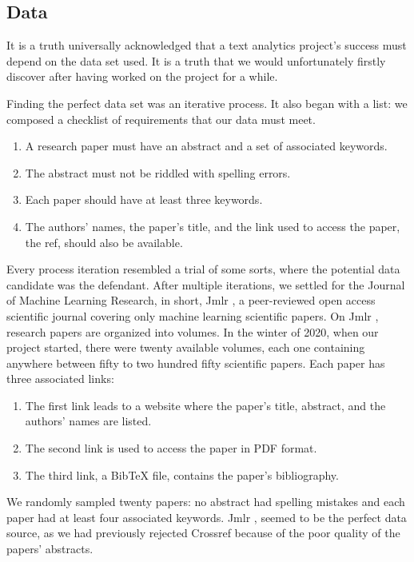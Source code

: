 \subsection{Data}

It is a truth universally acknowledged that a text analytics project's success must depend on the data set used. It is a truth that we would unfortunately firstly discover after having worked on the project for a while. 


Finding the perfect data set was an iterative process. It also began with a list: we composed a checklist of requirements that our data must meet. 
\begin{enumerate}
	\item A research paper must have an abstract and a set of associated keywords. 
	\item The abstract must not be riddled with spelling errors. 
	\item Each paper should have at least three keywords.
	\item The authors' names, the paper's title, and the link used to access the paper, the ref, should also be available.
\end{enumerate}

Every process iteration resembled a trial of some sorts, where the potential data candidate was the defendant. After multiple iterations, we settled for the Journal of Machine Learning Research, in short, Jmlr \cite{jmlr}, a peer-reviewed open access scientific journal covering only machine learning scientific papers.
On Jmlr \cite{jmlr}, research papers are organized into volumes. In the winter of 2020, when our project started, there were twenty available volumes, each one containing anywhere between fifty to two hundred fifty scientific papers. Each paper has three associated links: 
\begin{enumerate}
	\item The first link leads to a website where the paper's title, abstract, and the authors' names are listed. 
	\item The second link is used to access the paper in PDF format. 
	\item The third link, a BibTeX file, contains the paper's bibliography.
\end{enumerate}

We randomly sampled twenty papers: no abstract had spelling mistakes and each paper had at least four associated keywords. Jmlr \cite{jmlr}, seemed to be the perfect data source, as we had previously rejected Crossref \cite{crossref} because of the poor quality of the papers' abstracts.


